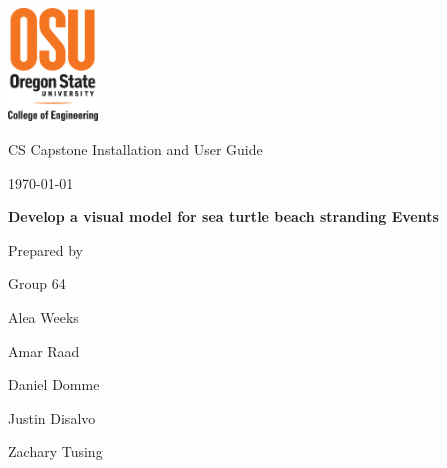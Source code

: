 \documentclass[onecolumn, draftclsnofoot,10pt, compsoc]{IEEEtran}
\def \CapstoneTeamName{		Beached Marine Critters Project Team}
\def \CapstoneTeamNumber{		64}
\def \GroupMemberOne{			Alea Weeks}
\def \GroupMemberTwo{			Amar Raad}
\def \GroupMemberThree{			Daniel Domme}
\def \GroupMemberFour{			Justin Disalvo}
\def \GroupMemberFive{			Zachary Tusing}
\def \CapstoneProjectName{		Develop a visual model for sea turtle beach stranding Events}
\def \CapstoneSponsorCompany{	Oregon State University Hatfield Marine Science Center; Oregon Sea Grant}
\def \CapstoneSponsorPerson{		Dr. William Hanshumaker}
\def \DocType{		%
				Installation and User Guide
				}
\newcommand{\NameSigPair}[1]{\par
\makebox[2.75in][r]{#1} \hfil 	\makebox[3.25in]{\makebox[2.25in]{\hrulefill} \hfill		\makebox[.75in]{\hrulefill}}
\par\vspace{-12pt} \textit{\tiny\noindent
\makebox[2.75in]{} \hfil		\makebox[3.25in]{\makebox[2.25in][r]{Signature} \hfill	\makebox[.75in][r]{Date}}}}
\renewcommand{\NameSigPair}[1]{#1}
\begin{document}
\begin{titlepage}
    \begin{singlespace}
     \includegraphics[height=3cm]{coe_v_spot1}
        \hfill 
        \par\vspace{.2in}
        \centering
        \scshape{
            \huge CS Capstone \DocType \par
            {\normalsize\today}\par
            \vspace{.5in}
            \textbf{\Huge\CapstoneProjectName}\par
            \vspace{1in}
            {\large Prepared by }\par
            Group\CapstoneTeamNumber\par
            \vspace{5pt}
            {\Large
                \NameSigPair{\GroupMemberOne}\par
                \NameSigPair{\GroupMemberTwo}\par
                \NameSigPair{\GroupMemberThree}\par
				\NameSigPair{\GroupMemberFour}\par
			\NameSigPair{\GroupMemberFive}\par
            }
            \vspace{20pt}
        }
        \vfill
		    

\end{singlespace}
\end{titlepage}
\end{document}
